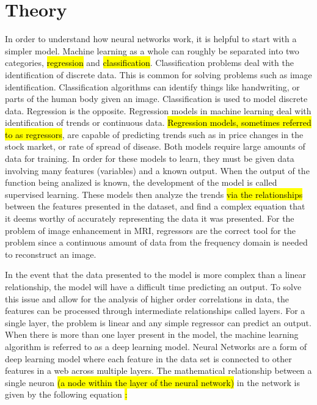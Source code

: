 \documentclass[14pt]{extreport}
\begin{document}
    \section*{Theory}
        In order to understand how neural networks work, it is helpful to start with a simpler model. Machine learning as a whole can roughly be separated into two categories, \hl{regression} and \hl{classification}. Classification problems deal with the identification of discrete data. This is common for solving problems such as image identification. Classification algorithms can identify things like handwriting, or parts of the human body given an image. Classification is used to model discrete data. Regression is the opposite. Regression models in machine learning deal with identification of trends or continuous data. \hl{Regression models, sometimes referred to as regressors}, are capable of predicting trends such as in price changes in the stock market, or rate of spread of disease. Both models require large amounts of data for training. In order for these models to learn, they must be given data involving many features (variables) and a known output. When the output of the function being analized is known, the development of the model is called supervised learning. These models then analyze the trends \hl{via the relationships} between the features presented in the dataset, and find a complex equation that it deems worthy of accurately representing the data it was presented. For the problem of image enhancement in MRI, regressors are the correct tool for the problem since a continuous amount of data from the frequency domain is needed to reconstruct an image. 

        In the event that the data presented to the model is more complex than a linear relationship, the model will have a difficult time predicting an output\cite{Raschka_2022}. To solve this issue and allow for the analysis of higher order correlations in data, the features can be processed through intermediate relationships called layers. For a single layer, the problem is linear and any simple regressor can predict an output. When there is more than one layer present in the model, the machine learning algorithm is referred to as a deep learning model. Neural Networks are a form of deep learning model where each feature in the data set is connected to other features in a web across multiple layers. The mathematical relationship between a single neuron \hl{(a node within the layer of the neural network)} in the network is given by the following equation \cite{Gazit_2024}\hl{:}
        
\end{document}
